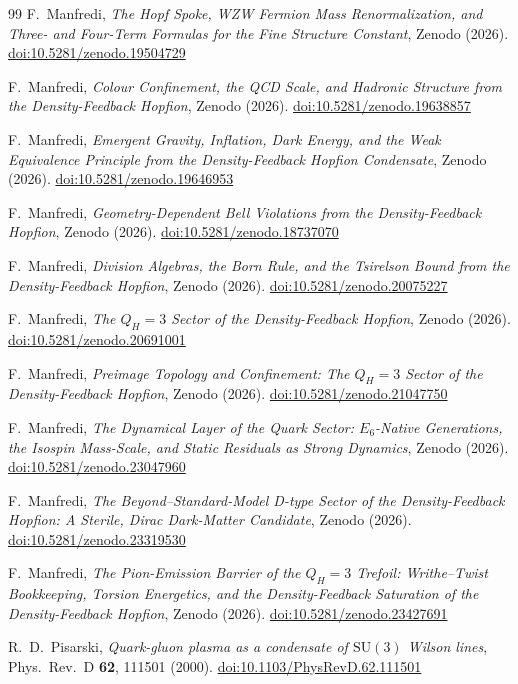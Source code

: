 \documentclass[11pt,a4paper]{article}
\theoremstyle{definition}\newtheorem{definition}[theorem]{Definition}
\newcommand{\SU}{\mathrm{SU}}
\begin{document}
\begin{thebibliography}{99}
 F.~Manfredi, \textit{The Hopf Spoke, WZW Fermion Mass Renormalization,
and Three- and Four-Term Formulas for the Fine Structure Constant}, Zenodo (2026).
\href{https://doi.org/10.5281/zenodo.19504729}{doi:10.5281/zenodo.19504729}

 F.~Manfredi, \textit{Colour Confinement, the QCD Scale, and Hadronic Structure
from the Density-Feedback Hopfion}, Zenodo (2026).
\href{https://doi.org/10.5281/zenodo.19638857}{doi:10.5281/zenodo.19638857}

 F.~Manfredi, \textit{Emergent Gravity, Inflation, Dark Energy, and the Weak
Equivalence Principle from the Density-Feedback Hopfion Condensate}, Zenodo (2026).
\href{https://doi.org/10.5281/zenodo.19646953}{doi:10.5281/zenodo.19646953}

 F.~Manfredi, \textit{Geometry-Dependent Bell Violations from the
Density-Feedback Hopfion}, Zenodo (2026).
\href{https://doi.org/10.5281/zenodo.18737070}{doi:10.5281/zenodo.18737070}

 F.~Manfredi, \textit{Division Algebras, the Born Rule, and the Tsirelson
Bound from the Density-Feedback Hopfion}, Zenodo (2026).
\href{https://doi.org/10.5281/zenodo.20075227}{doi:10.5281/zenodo.20075227}

 F.~Manfredi, \textit{The $Q_H=3$ Sector of the Density-Feedback Hopfion},
Zenodo (2026). \href{https://doi.org/10.5281/zenodo.20691001}{doi:10.5281/zenodo.20691001}

 F.~Manfredi, \textit{Preimage Topology and Confinement: The $Q_H=3$ Sector
of the Density-Feedback Hopfion}, Zenodo (2026).
\href{https://doi.org/10.5281/zenodo.21047750}{doi:10.5281/zenodo.21047750}

 F.~Manfredi, \textit{The Dynamical Layer of the Quark Sector: $E_6$-Native
Generations, the Isospin Mass-Scale, and Static Residuals as Strong Dynamics}, Zenodo (2026).
\href{https://doi.org/10.5281/zenodo.23047960}{doi:10.5281/zenodo.23047960}

 F.~Manfredi, \textit{The Beyond--Standard-Model D-type Sector of the
Density-Feedback Hopfion: A Sterile, Dirac Dark-Matter Candidate}, Zenodo (2026).
\href{https://doi.org/10.5281/zenodo.23319530}{doi:10.5281/zenodo.23319530}

 F.~Manfredi, \textit{The Pion-Emission Barrier of the $Q_H=3$ Trefoil:
Writhe--Twist Bookkeeping, Torsion Energetics, and the Density-Feedback Saturation of the
Density-Feedback Hopfion}, Zenodo (2026). \href{https://doi.org/10.5281/zenodo.23427691}{doi:10.5281/zenodo.23427691}

 R.~D.~Pisarski, \textit{Quark-gluon plasma as a condensate of
$\SU(3)$ Wilson lines}, Phys.\ Rev.\ D \textbf{62}, 111501 (2000).
\href{https://doi.org/10.1103/PhysRevD.62.111501}{doi:10.1103/PhysRevD.62.111501}

\end{thebibliography}
\end{document}
